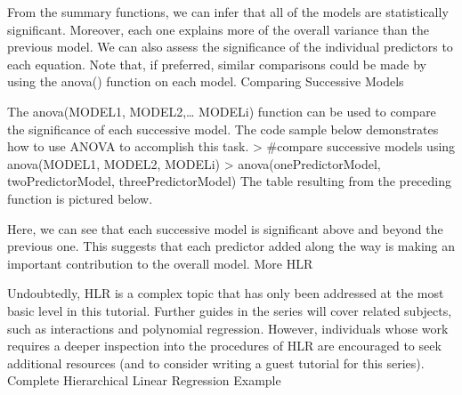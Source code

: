 From the summary functions, we can infer that all of the models are statistically significant. Moreover, each one explains more of the overall variance than the previous model. We can also assess the significance of the individual predictors to each equation. Note that, if preferred, similar comparisons could be made by using the anova() function on each model. 
Comparing Successive Models

The anova(MODEL1, MODEL2,… MODELi) function can be used to compare the significance of each successive model. The code sample below demonstrates how to use ANOVA to accomplish this task.
> #compare successive models using anova(MODEL1, MODEL2, MODELi)
> anova(onePredictorModel, twoPredictorModel, threePredictorModel)
The table resulting from the preceding function is pictured below.


Here, we can see that each successive model is significant above and beyond the previous one. This suggests that each predictor added along the way is making an important contribution to the overall model.
More HLR

Undoubtedly, HLR is a complex topic that has only been addressed at the most basic level in this tutorial. Further guides in the series will cover related subjects, such as interactions and polynomial regression. However, individuals whose work requires a deeper inspection into the procedures of HLR are encouraged to seek additional resources (and to consider writing a guest tutorial for this series).
Complete Hierarchical Linear Regression Example
